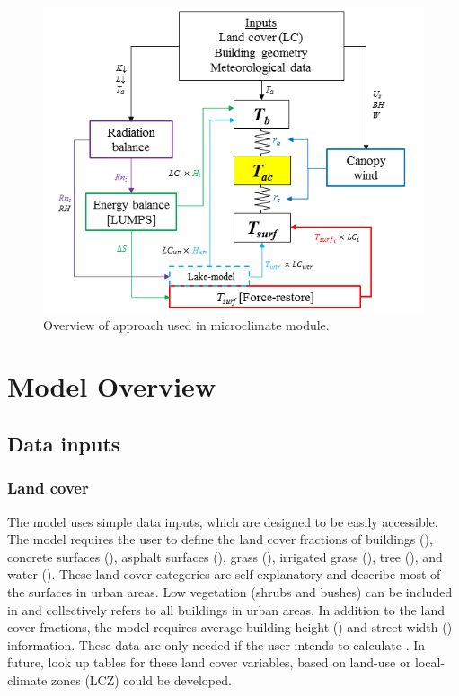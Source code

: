 \documentclass[final,3p,times,authoryear]{elsarticle}
\begin{document}
\begin{figure}[!htbp]
\includegraphics[trim=5mm 0mm 5mm 0mm, clip,scale=1.0]{images/Overview.png}
 \caption{Overview of approach used in  microclimate module.} \label{fig:overview}
\end{figure}

\section{Model Overview}\label{sec:ModelOverview}

\subsection{Data inputs}\label{sec:datainputs}
\subsubsection{Land cover}\label{sec:landcover}

The model uses simple data inputs, which are designed to be easily accessible. The model requires the user to define the land cover fractions of buildings (), concrete surfaces (), asphalt surfaces (), grass (), irrigated grass (), tree (), and water (). These land cover categories are self-explanatory and describe most of the surfaces in urban areas. Low vegetation (shrubs and bushes) can be included in  and  collectively refers to all buildings in urban areas.  In addition to the land cover fractions, the model requires average building height () and street width () information. These data are only needed if the user intends to calculate ­. In future, look up tables for these land cover variables, based on land-use or local-climate zones (LCZ) \citep{Stewart2012a} could be developed. 
\end{document}
